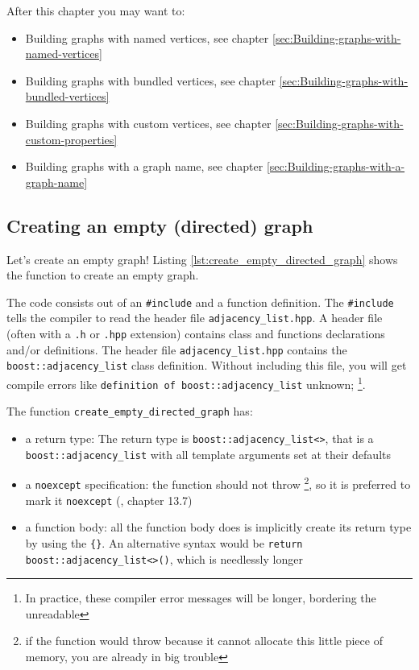 After this chapter you may want to:

\begin{itemize}
  \item Building graphs with named vertices, 
    see chapter \ref{sec:Building-graphs-with-named-vertices}
  \item Building graphs with bundled vertices, 
    see chapter \ref{sec:Building-graphs-with-bundled-vertices}
  \item Building graphs with custom vertices,
    see chapter \ref{sec:Building-graphs-with-custom-properties}
  \item Building graphs with a graph name,
    see chapter \ref{sec:Building-graphs-with-a-graph-name}
\end{itemize}

\subsection{Creating an empty (directed) graph}
\label{subsec:create_empty_directed_graph}

Let's create an empty graph! 
Listing \ref{lst:create_empty_directed_graph} 
shows the function to create an empty graph.



The code consists out of an \verb;#include; and a function definition.
The \verb;#include; tells the compiler 
to read the header file \verb;adjacency_list.hpp;.
A header file (often with a \verb;.h; or \verb;.hpp; extension) 
contains class and functions declarations and/or definitions.
The header file \verb;adjacency_list.hpp; contains the 
\verb;boost::adjacency_list; class definition.
Without including this file, you will get compile errors like 
\verb;definition of boost::adjacency_list; unknown;
\footnote{
  In practice, these compiler error messages will be longer, bordering the unreadable
}. 

The function \verb;create_empty_directed_graph; has:

\begin{itemize}
  \item a return type: 
    The return type is \verb;boost::adjacency_list<>;, 
    that is a \verb;boost::adjacency_list; 
    with all template arguments set at their defaults
  \item a \verb;noexcept; specification: 
    the function should not throw
    \footnote{
      if the function would throw because it cannot allocate this little piece
      of memory, you are already in big trouble
    }, so it is preferred to mark it \verb;noexcept; 
    (\cite{stroustrup2013}, chapter 13.7)
  \item a function body: 
    all the function body does is implicitly create its return
    type by using the \verb;{};.
    An alternative syntax would be \verb;return boost::adjacency_list<>();,
    which is needlessly longer
\end{itemize}

